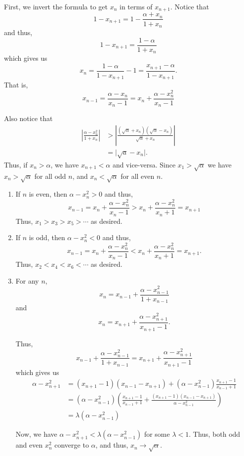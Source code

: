 \documentclass[12 pt, letterpaper]{hmcpset}
\begin{document}
\begin{solution}
	First, we invert the formula to get $x_{n}$ in terms of $x_{n + 1}$. Notice that
	\[
		1 - x_{n + 1} = 1 - \frac{\alpha + x_{n}}{1 + x_{n}}
	\]
	and thus,
	\[
		1 - x_{n + 1} = \frac{1 - \alpha}{1 + x_{n}}
	\]
	which gives us
	\[
		x_{n} = \frac{1 - \alpha}{1 - x_{n + 1}} - 1 = \frac{x_{n + 1} - \alpha}{1 - x_{n + 1}}.
	\]
	That is,
	\[
		x_{n - 1} = \frac{\alpha - x_{n}}{x_{n} - 1} = x_{n} + \frac{\alpha - x_{n}^{2}}{x_{n} - 1}
	\]

	Also notice that
	\[
		\begin{split}
			\left \lvert \frac{\alpha - x_{n}^{2}}{1 + x_{n}} \right \rvert & > \left \lvert \frac{(\sqrt{\alpha} + x_{n}) (\sqrt{\alpha} - x_{n})}{\sqrt{\alpha} + x_{n}} \right \rvert \\
							     & = \lvert \sqrt{a} - x_{n} \rvert.
		\end{split}
	\]
	Thus, if $x_{n} > \alpha$, we have  $x_{n + 1} < \alpha$ and vice-versa. Since $x_{1} > \sqrt{\alpha}$ we have $x_{n} > \sqrt{\alpha}$ for all odd $n$, and $x_{n} < \sqrt{\alpha}$ for all even $n$. 

	\begin{enumerate}
		\item If $n$ is even, then $\alpha - x_{n}^{2} > 0$ and thus,
			\[
				x_{n - 1} = x_{n} + \frac{\alpha - x_{n}^{2}}{x_{n} - 1} > x_{n} + \frac{\alpha - x_{n}^{2}}{x_{n} + 1} = x_{n + 1}
			\]
			Thus, $x_{1} > x_{3} > x_{5} > \cdots$ as desired.
		\item If $n$ is odd, then $\alpha - x_{n}^{2} < 0$ and thus,
			\[
				x_{n - 1} = x_{n} + \frac{\alpha - x_{n}^{2}}{x_{n} - 1} < x_{n} + \frac{\alpha - x_{n}^{2}}{x_{n} + 1} = x_{n + 1}.
			\]
			Thus, $x_{2} < x_{4} < x_{6} < \cdots$ as desired.
		\item For any $n$,
			\[
				x_{n} = x_{n - 1} + \frac{\alpha - x_{n - 1}^{2}}{1 + x_{n - 1}}
			\]
			and
			\[
				x_{n} = x_{n + 1} + \frac{\alpha - x_{n + 1}^{2}}{x_{n + 1} - 1}.
			\]

			Thus,
			\[
				x_{n - 1} + \frac{\alpha - x_{n - 1}^{2}}{1 + x_{n - 1}} = x_{n + 1} + \frac{\alpha - x_{n + 1}^{2}}{x_{n + 1} - 1}
			\]
			which gives us
			\[
				\begin{split}
					\alpha - x_{n + 1}^{2} & = (x_{n + 1} - 1)(x_{n - 1} - x_{n + 1}) + (\alpha - x_{n - 1}^{2}) \frac{x_{n + 1} - 1}{x_{n - 1} + 1} \\
							       & = (\alpha - x_{n - 1}^{2}) \left ( \frac{x_{n + 1} - 1}{x_{n - 1} + 1} + \frac{(x_{n + 1} - 1)(x_{n - 1} - x_{n + 1})}{\alpha - x_{n - 1}^{2}} \right ) \\
							       & = \lambda (\alpha - x_{n - 1}^{2})
				\end{split}
			\]

			Now, we have $\alpha - x_{n + 1}^{2} < \lambda (\alpha - x_{n - 1}^{2})$ for some $\lambda < 1$. Thus, both odd and even $x_{n}^{2}$ converge to $\alpha$, and thus, $x_{n} \to \sqrt{\alpha}$.
	\end{enumerate}
\end{solution}
\end{document}
